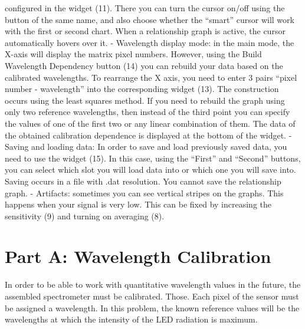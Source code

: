 \documentclass[11pt,a4paper]{article}
\begin{document}
configured in the widget (11). There you can turn the cursor on/off using the button of the same name, and also choose whether the “smart” cursor will work with the first or second chart. When a relationship graph is active, the cursor automatically hovers over it. - Wavelength display mode: in the main mode, the X-axis will display the matrix pixel numbers. However, using the Build Wavelength Dependency button (14) you can rebuild your data based on the calibrated wavelengths. To rearrange the X axis, you need to enter 3 pairs “pixel number - wavelength” into the corresponding widget (13). The construction occurs using the least squares method. If you need to rebuild the graph using only two reference wavelengths, then instead of the third point you can specify the values of one of the first two or any linear combination of them. The data of the obtained calibration dependence is displayed at the bottom of the widget. - Saving and loading data: In order to save and load previously saved data, you need to use the widget (15). In this case, using the “First” and “Second” buttons, you can select which slot you will load data into or which one you will save into. Saving occurs in a file with .dat resolution. You cannot save the relationship graph. - Artifacts: sometimes you can see vertical stripes on the graphs. This happens when your signal is very low. This can be fixed by increasing the sensitivity (9) and turning on averaging (8).

\section*{Part A: Wavelength Calibration}

In order to be able to work with quantitative wavelength values in the future, the assembled spectrometer must be calibrated. Those. Each pixel of the sensor must be assigned a wavelength. In this problem, the known reference values will be the wavelengths at which the intensity of the LED radiation is maximum.
\end{document}
